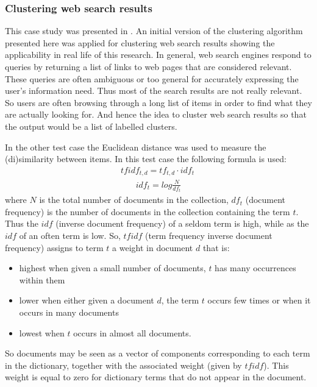 \subsubsection{Clustering web search results}
This case study was presented in \cite{Gaceanu10AnAdaptive}. An initial version of the clustering algorithm presented here was applied for clustering web search results showing the applicability in real life of this research. In general, web search engines respond to queries by returning a list of links to web pages that are considered relevant. These queries are often ambiguous or too general for accurately expressing the user’s information need. Thus most of the search results are not really relevant. So users are often browsing through a long list of items in order to find what they are actually looking for. And hence the idea to cluster web search results so that the output would be a list of labelled clusters. 

In the other test case the Euclidean distance was used to measure the (di)similarity between items. In this test case the following formula is used:
\begin{align}
\label{rel:tfidf}
tfidf_{t,d}=tf_{t,d} \cdot idf_t\
\end{align}
\begin{align}
\label{rel:idf}
idf_t=log\frac{N}{df_t}
\end{align}
where $N$ is the total number of documents in the collection, \begin{math} df_t  \end{math} (document frequency) is the number of documents in the collection containing the term $t$.
Thus the $idf$ (inverse document frequency) of a seldom term is high, while as the $idf$ of an often term is low.
So, $tfidf$ (term frequency inverse document frequency) assigns to term $t$ a weight in document $d$ that is:
\begin{itemize}
\item  highest when given a small number of documents, $t$ has many occurrences within them
\item  lower when either given a document $d$, the term $t$ occurs few times or when it occurs in many documents
\item  lowest when $t$ occurs in almost all documents.
\end{itemize}
So documents may be seen as a vector of components corresponding to each term in the dictionary, together with the associated weight (given by $tfidf$). This weight is equal to zero for dictionary terms that do not appear in the document.

